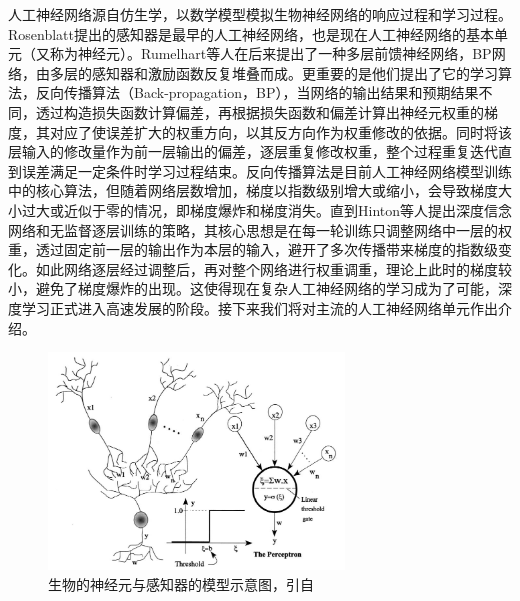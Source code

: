 人工神经网络源自仿生学，以数学模型模拟生物神经网络的响应过程和学习过程。Rosenblatt提出的感知器\cite{rosenblatt1958perceptron}是最早的人工神经网络，也是现在人工神经网络的基本单元（又称为神经元）。Rumelhart等人\cite{rumelhart1985learning}在后来提出了一种多层前馈神经网络，BP网络，由多层的感知器和激励函数反复堆叠而成。更重要的是他们提出了它的学习算法，反向传播算法（Back-propagation，BP），当网络的输出结果和预期结果不同，透过构造损失函数计算偏差，再根据损失函数和偏差计算出神经元权重的梯度，其对应了使误差扩大的权重方向，以其反方向作为权重修改的依据。同时将该层输入的修改量作为前一层输出的偏差，逐层重复修改权重，整个过程重复迭代直到误差满足一定条件时学习过程结束。反向传播算法是目前人工神经网络模型训练中的核心算法，但随着网络层数增加，梯度以指数级别增大或缩小，会导致梯度大小过大或近似于零的情况，即梯度爆炸和梯度消失。直到Hinton等人\cite{hinton2006fast}提出深度信念网络和无监督逐层训练的策略，其核心思想是在每一轮训练只调整网络中一层的权重，透过固定前一层的输出作为本层的输入，避开了多次传播带来梯度的指数级变化。如此网络逐层经过调整后，再对整个网络进行权重调重，理论上此时的梯度较小，避免了梯度爆炸的出现。这使得现在复杂人工神经网络的学习成为了可能，深度学习正式进入高速发展的阶段。接下来我们将对主流的人工神经网络单元作出介绍。

\begin{figure}[H]
  \centering
  \includegraphics[width=0.7\textwidth]{img/perceptron.png}
  \caption{生物的神经元与感知器的模型示意图，引自\cite{basheer2000artificial}}
  \label{fig:perceptron}
\end{figure}

